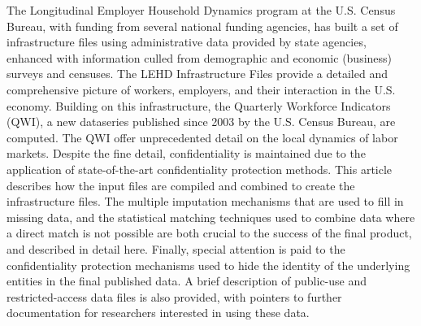 

The Longitudinal Employer Household Dynamics program at the U.S. Census
Bureau, with funding from several national funding agencies, has built a
set of infrastructure files using administrative data provided by state
agencies, enhanced with information culled from demographic and economic
(business) surveys and censuses. The LEHD Infrastructure Files provide a
detailed and comprehensive picture of workers, employers, and their
interaction in the U.S. economy. Building on this infrastructure, the
Quarterly Workforce Indicators (QWI), a new dataseries published since 2003
by the U.S. Census Bureau, are computed. The QWI offer unprecedented detail
on the local dynamics of labor markets. Despite the fine detail,
confidentiality is maintained due to the application of state-of-the-art
confidentiality protection methods. This article describes how the input
files are compiled and combined to create the infrastructure files. The
multiple imputation mechanisms that are used to fill in missing data, and
the statistical matching techniques used to combine data where a direct
match is not possible are both crucial to the success of the final product,
and described in detail here. Finally, special attention is paid to the
confidentiality protection mechanisms used to hide the identity of the
underlying entities in the final published data. A brief description of
public-use and restricted-access data files is also provided, with pointers
to further documentation for researchers  interested in using these data.


